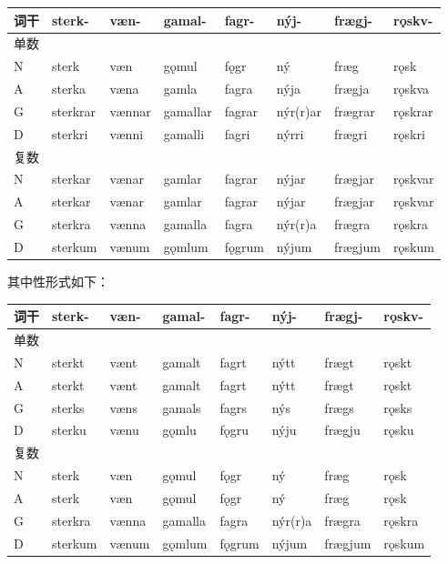 \begin{longtable}{llllllll}
  \toprule
  词干 & sterk-   & væn-   & gamal-   & fagr-  & nýj-     & frægj-  & rǫskv-  \\
  \midrule
  \endhead
  \bottomrule
  \endfoot
  单数 &          &        &          &        &          &         &         \\
  N    & sterk    & væn    & gǫmul    & fǫgr   & ný       & fræg    & rǫsk    \\
  A    & sterka   & væna   & gamla    & fagra  & nýja     & frægja  & rǫskva  \\
  G    & sterkrar & vænnar & gamallar & fagrar & nýr(r)ar & frægrar &
  rǫskrar                                                                     \\
  D    & sterkri  & vænni  & gamalli  & fagri  & nýrri    & frægri  & rǫskri  \\
  复数 &          &        &          &        &          &         &         \\
  N    & sterkar  & vænar  & gamlar   & fagrar & nýjar    & frægjar & rǫskvar \\
  A    & sterkar  & vænar  & gamlar   & fagrar & nýjar    & frægjar & rǫskvar \\
  G    & sterkra  & vænna  & gamalla  & fagra  & nýr(r)a  & frægra  & rǫskra  \\
  D    & sterkum  & vænum  & gǫmlum   & fǫgrum & nýjum    & frægjum & rǫskum  \\
\end{longtable}

其中性形式如下：

\begin{longtable}{llllllll}
  \toprule
  词干 & sterk-  & væn-  & gamal-  & fagr-  & nýj-    & frægj-  & rǫskv- \\
  \midrule
  \endhead
  \bottomrule
  \endfoot
  单数 &         &       &         &        &         &         &        \\
  N    & sterkt  & vænt  & gamalt  & fagrt  & nýtt    & frægt   & rǫskt  \\
  A    & sterkt  & vænt  & gamalt  & fagrt  & nýtt    & frægt   & rǫskt  \\
  G    & sterks  & væns  & gamals  & fagrs  & nýs     & frægs   & rǫsks  \\
  D    & sterku  & vænu  & gǫmlu   & fǫgru  & nýju    & frægju  & rǫsku  \\
  复数 &         &       &         &        &         &         &        \\
  N    & sterk   & væn   & gǫmul   & fǫgr   & ný      & fræg    & rǫsk   \\
  A    & sterk   & væn   & gǫmul   & fǫgr   & ný      & fræg    & rǫsk   \\
  G    & sterkra & vænna & gamalla & fagra  & nýr(r)a & frægra  & rǫskra \\
  D    & sterkum & vænum & gǫmlum  & fǫgrum & nýjum   & frægjum & rǫskum \\
\end{longtable}

